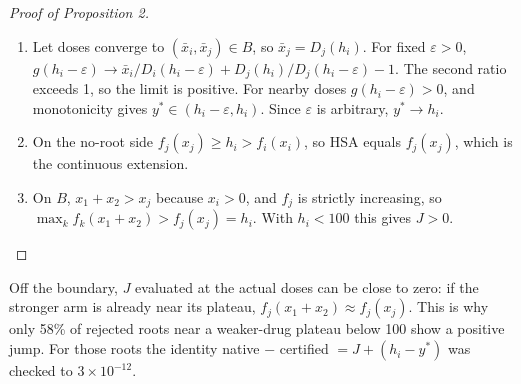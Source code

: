 \documentclass[11pt]{article}
\begin{document}
\begin{proof}[Proof of Proposition 2]
\begin{enumerate}
\item Let doses converge to $(\bar x_i,\bar x_j)\in B$, so $\bar x_j=D_j(h_i)$. For fixed $\varepsilon>0$, $g(h_i-\varepsilon)\to\bar x_i/D_i(h_i-\varepsilon)+D_j(h_i)/D_j(h_i-\varepsilon)-1$. The second ratio exceeds 1, so the limit is positive. For nearby doses $g(h_i-\varepsilon)>0$, and monotonicity gives $y^*\in(h_i-\varepsilon,h_i)$. Since $\varepsilon$ is arbitrary, $y^*\to h_i$.
\item On the no-root side $f_j(x_j)\ge h_i>f_i(x_i)$, so HSA equals $f_j(x_j)$, which is the continuous extension.
\item On $B$, $x_1+x_2>x_j$ because $x_i>0$, and $f_j$ is strictly increasing, so $\max_kf_k(x_1+x_2)>f_j(x_j)=h_i$. With $h_i<100$ this gives $J>0$.\qedhere
\end{enumerate}
\end{proof}
Off the boundary, $J$ evaluated at the actual doses can be close to zero: if the stronger arm is already near its plateau, $f_j(x_1+x_2)\approx f_j(x_j)$. This is why only 58\% of rejected roots near a weaker-drug plateau below 100 show a positive jump. For those roots the identity native − certified $=J+(h_i-y^*)$ was checked to $3\times10^{-12}$.
\end{document}
